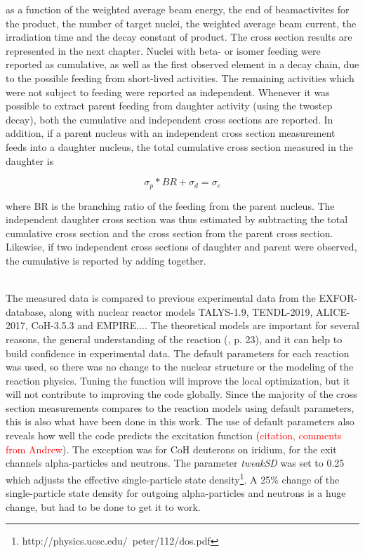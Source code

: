 as a function of the weighted average beam energy,  the end of beamactivites for the product, the number of target nuclei, the weighted average beam current, the irradiation time and the decay constant of product. The cross section results are represented in the next chapter. Nuclei with beta- or isomer feeding were reported as cumulative, as well as the first observed element in a decay chain, due to the possible feeding from short-lived activities. The remaining activities which were not subject to feeding were reported as independent. Whenever it was possible to extract parent feeding from daughter activity (using the twostep decay), both the cumulative and independent cross sections are reported. In addition, if a parent nucleus with an independent cross section measurement feeds into a daughter nucleus, the total cumulative cross section measured in the daughter is

\begin{equation}
    \sigma_p*BR + \sigma_d = \sigma_{c}
\end{equation}

where BR is the branching ratio of the feeding from the parent nucleus. The independent daughter cross section was thus estimated by subtracting the total cumulative cross section and the cross section from the parent cross section. Likewise, if two independent cross sections of daughter and parent were observed, the cumulative is reported by adding together. 


\\

\noindent 
The measured data is compared to previous experimental data from the EXFOR-database, along with nuclear reactor models TALYS-1.9, TENDL-2019, ALICE-2017\cite{Blann1996}, CoH-3.5.3 and EMPIRE.... The theoretical models are important for several reasons, the general understanding of the reaction (\cite{international2012iaea}, p. 23), and it can help to build confidence in experimental data. The default parameters for each reaction was used, so there was no change to the nuclear structure or the modeling of the reaction physics. Tuning the function will improve the local optimization, but it will not contribute to improving the code globally. Since the majority of the cross section measurements compares to the reaction models using default parameters, this is also what have been done in this work. The use of default parameters also reveals how well the code predicts the excitation function (\textcolor{red}{citation, comments from Andrew}). The exception was for CoH deuterons on iridium, for the exit channels alpha-particles and neutrons. The parameter \textit{tweakSD} was set to 0.25 which adjusts the effective single-particle state density\footnote{http://physics.ucsc.edu/~peter/112/dos.pdf}. A 25\% change of the single-particle state density for outgoing alpha-particles and neutrons is a huge change, but had to be done to get it to work. \\

